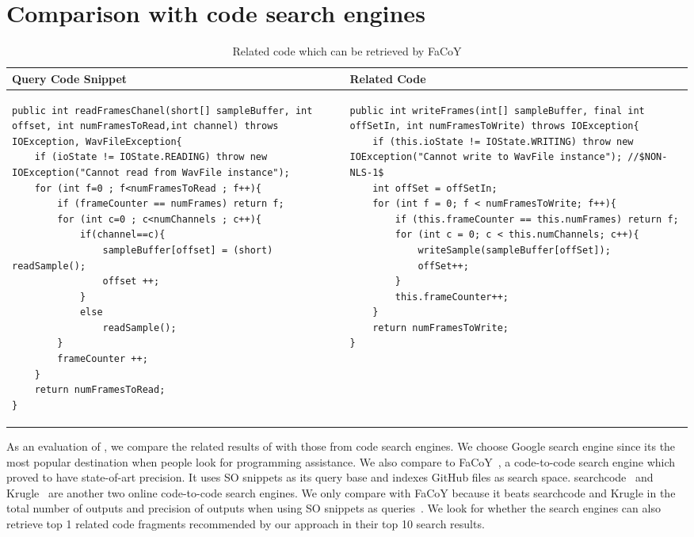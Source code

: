 \section{Comparison with code search engines}
\label{sec:comparison}

\lstset{
	frame=none,
	aboveskip=0pt,
	belowskip=0pt,
	basicstyle=\tiny\ttfamily,
}
\begin{table*}\scriptsize
	\caption{Related code which can be retrieved by FaCoY}
	\label{tab:facoy-example}
	
	\setlength{\tabcolsep}{0.01\textwidth}
	\begin{tabular}{@{}p{}p{}@{}}
		\toprule
		Query Code Snippet & Related Code \\
		\midrule


\begin{lstlisting}
public int readFramesChanel(short[] sampleBuffer, int offset, int numFramesToRead,int channel) throws IOException, WavFileException{
	if (ioState != IOState.READING) throw new IOException("Cannot read from WavFile instance");
	for (int f=0 ; f<numFramesToRead ; f++){
		if (frameCounter == numFrames) return f;
		for (int c=0 ; c<numChannels ; c++){
			if(channel==c){
				sampleBuffer[offset] = (short) readSample();
				offset ++;
			}
			else
				readSample();
		}
		frameCounter ++;
	}
	return numFramesToRead;
}
\end{lstlisting}
		
		&
\begin{lstlisting}
public int writeFrames(int[] sampleBuffer, final int offSetIn, int numFramesToWrite) throws IOException{
	if (this.ioState != IOState.WRITING) throw new IOException("Cannot write to WavFile instance"); //$NON-NLS-1$
	int offSet = offSetIn;
	for (int f = 0; f < numFramesToWrite; f++){
		if (this.frameCounter == this.numFrames) return f;
		for (int c = 0; c < this.numChannels; c++){
			writeSample(sampleBuffer[offSet]);
			offSet++;
		}
		this.frameCounter++;
	}
	return numFramesToWrite;
}
		
\end{lstlisting}
\\

\bottomrule
	\end{tabular}
\end{table*}
		

As an evaluation of {\tool}, we compare the related results of {\tool} with those from code search engines. We choose Google search engine since its the most popular destination when people look for programming assistance. We also compare to {\ttt FaCoY}~\cite{kim2018Facoy}, a code-to-code search engine which proved to have state-of-art precision. It uses SO snippets as its query base and indexes GitHub files as search space. {\ttt searchcode}~\cite{searchcode} and {\ttt Krugle}~\cite{krugle} are another two online code-to-code search engines. We only compare with {\ttt FaCoY} because it beats {\ttt searchcode} and {\ttt Krugle} in the total number of outputs and precision of outputs when using SO snippets as queries~\cite{kim2018Facoy}. 
We look for whether the search engines can also retrieve top 1 related code fragments recommended by our approach in their top 10 search results. 

